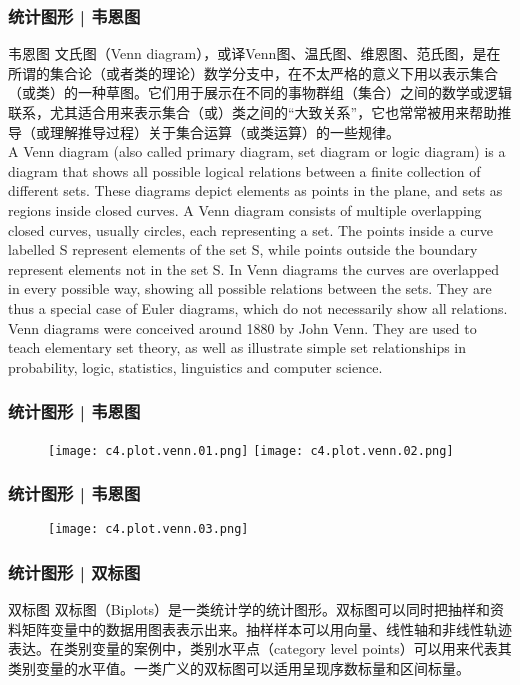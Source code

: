 \begin{frame}
  \frametitle{统计图形 | 韦恩图}
  \begin{block}{韦恩图}
    {\footnotesize
    文氏图（Venn diagram），或译Venn图、温氏图、维恩图、范氏图，是在所谓的集合论（或者类的理论）数学分支中，在不太严格的意义下用以表示集合（或类）的一种草图。它们用于展示在不同的事物群组（集合）之间的数学或逻辑联系，尤其适合用来表示集合（或）类之间的“大致关系”，它也常常被用来帮助推导（或理解推导过程）关于集合运算（或类运算）的一些规律。\\
    \vspace{0.5em}
    A Venn diagram (also called primary diagram, set diagram or logic diagram) is a diagram that shows all possible logical relations between a finite collection of different sets. These diagrams depict elements as points in the plane, and sets as regions inside closed curves. A Venn diagram consists of multiple overlapping closed curves, usually circles, each representing a set. The points inside a curve labelled S represent elements of the set S, while points outside the boundary represent elements not in the set S. In Venn diagrams the curves are overlapped in every possible way, showing all possible relations between the sets. They are thus a special case of Euler diagrams, which do not necessarily show all relations. Venn diagrams were conceived around 1880 by John Venn. They are used to teach elementary set theory, as well as illustrate simple set relationships in probability, logic, statistics, linguistics and computer science.\\
  }
  \end{block}
\end{frame}

\begin{frame}
  \frametitle{统计图形 | 韦恩图}
  \begin{figure}
    \centering
    \texttt{[image: c4.plot.venn.01.png]}
    \texttt{[image: c4.plot.venn.02.png]}
  \end{figure}
\end{frame}

\begin{frame}
  \frametitle{统计图形 | 韦恩图}
  \begin{figure}
    \centering
    \texttt{[image: c4.plot.venn.03.png]}
  \end{figure}
\end{frame}

\begin{frame}
  \frametitle{统计图形 | 双标图}
  \begin{block}{双标图}
双标图（Biplots）是一类统计学的统计图形。双标图可以同时把抽样和资料矩阵变量中的数据用图表表示出来。抽样样本可以用向量、线性轴和非线性轨迹表达。在类别变量的案例中，类别水平点（category level points）可以用来代表其类别变量的水平值。一类广义的双标图可以适用呈现序数标量和区间标量。
  \end{block}
\end{frame}

